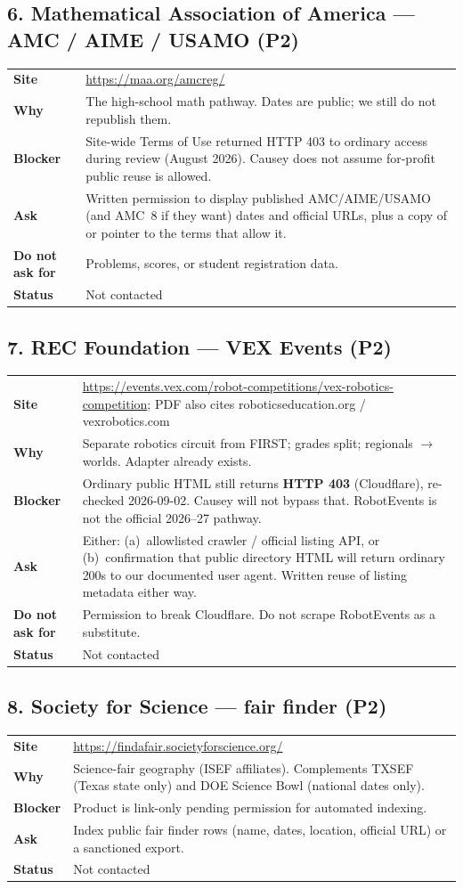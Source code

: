 \documentclass[11pt]{article}
\newcommand{\orgrow}[2]{%
  \textbf{#1} & #2 \\[0.35em]
}
\begin{document}
\subsection*{6. Mathematical Association of America --- AMC / AIME / USAMO (P2)}

\begin{tabularx}{\textwidth}{@{}L{2.55cm} Y@{}}
\orgrow{Site}{\url{https://maa.org/amcreg/}}
\orgrow{Why}{The high-school math pathway. Dates are public; we still do not republish them.}
\orgrow{Blocker}{Site-wide Terms of Use returned HTTP 403 to ordinary access during review (August 2026). Causey does not assume for-profit public reuse is allowed.}
\orgrow{Ask}{Written permission to display published AMC/AIME/USAMO (and AMC~8 if they want) dates and official URLs, plus a copy of or pointer to the terms that allow it.}
\orgrow{Do not ask for}{Problems, scores, or student registration data.}
\orgrow{Status}{Not contacted}
\end{tabularx}

\subsection*{7. REC Foundation --- VEX Events (P2)}

\begin{tabularx}{\textwidth}{@{}L{2.55cm} Y@{}}
\orgrow{Site}{\url{https://events.vex.com/robot-competitions/vex-robotics-competition}; PDF also cites roboticseducation.org / vexrobotics.com}
\orgrow{Why}{Separate robotics circuit from FIRST; grades split; regionals $\rightarrow$ worlds. Adapter already exists.}
\orgrow{Blocker}{Ordinary public HTML still returns \textbf{HTTP 403} (Cloudflare), re-checked 2026-09-02. Causey will not bypass that. RobotEvents is not the official 2026--27 pathway.}
\orgrow{Ask}{Either: (a)~allowlisted crawler / official listing API, or (b)~confirmation that public directory HTML will return ordinary 200s to our documented user agent. Written reuse of listing metadata either way.}
\orgrow{Do not ask for}{Permission to break Cloudflare. Do not scrape RobotEvents as a substitute.}
\orgrow{Status}{Not contacted}
\end{tabularx}

\subsection*{8. Society for Science --- fair finder (P2)}

\begin{tabularx}{\textwidth}{@{}L{2.55cm} Y@{}}
\orgrow{Site}{\url{https://findafair.societyforscience.org/}}
\orgrow{Why}{Science-fair geography (ISEF affiliates). Complements TXSEF (Texas state only) and DOE Science Bowl (national dates only).}
\orgrow{Blocker}{Product is link-only pending permission for automated indexing.}
\orgrow{Ask}{Index public fair finder rows (name, dates, location, official URL) or a sanctioned export.}
\orgrow{Status}{Not contacted}
\end{tabularx}
\end{document}

